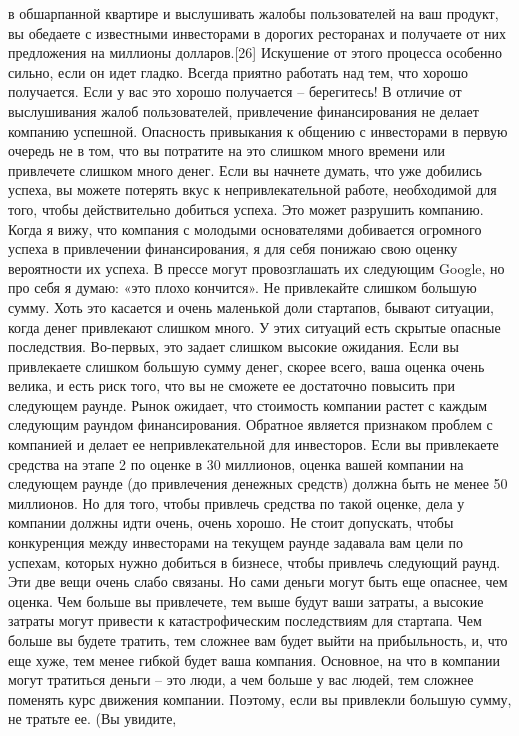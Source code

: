 \documentclass[ebook,12pt,oneside,openany]{memoir}
\begin{document}
в обшарпанной квартире и выслушивать жалобы пользователей на ваш
продукт, вы обедаете с известными инвесторами в дорогих ресторанах и
получаете от них предложения на миллионы долларов.[26] Искушение от
этого процесса особенно сильно, если он идет гладко. Всегда приятно
работать над тем, что хорошо получается. Если у вас это хорошо
получается – берегитесь! В отличие от выслушивания жалоб
пользователей, привлечение финансирования не делает компанию успешной.
Опасность привыкания к общению с инвесторами в первую очередь не в
том, что вы потратите на это слишком много времени или привлечете
слишком много денег. Если вы начнете думать, что уже добились успеха,
вы можете потерять вкус к непривлекательной работе, необходимой для
того, чтобы действительно добиться успеха. Это может разрушить
компанию. Когда я вижу, что компания с молодыми основателями
добивается огромного успеха в привлечении финансирования, я для себя
понижаю свою оценку вероятности их успеха. В прессе могут
провозглашать их следующим Google, но про себя я думаю: «это плохо
кончится». Не привлекайте слишком большую сумму. Хоть это касается и
очень маленькой доли стартапов, бывают ситуации, когда денег
привлекают слишком много. У этих ситуаций есть скрытые опасные
последствия. Во-первых, это задает слишком высокие ожидания. Если вы
привлекаете слишком большую сумму денег, скорее всего, ваша оценка
очень велика, и есть риск того, что вы не сможете ее достаточно
повысить при следующем раунде. Рынок ожидает, что стоимость компании
растет с каждым следующим раундом финансирования. Обратное является
признаком проблем с компанией и делает ее непривлекательной для
инвесторов. Если вы привлекаете средства на этапе 2 по оценке в 30
миллионов, оценка вашей компании на следующем раунде (до привлечения
денежных средств) должна быть не менее 50 миллионов. Но для того,
чтобы привлечь средства по такой оценке, дела у компании должны идти
очень, очень хорошо. Не стоит допускать, чтобы конкуренция между
инвесторами на текущем раунде задавала вам цели по успехам, которых
нужно добиться в бизнесе, чтобы привлечь следующий раунд. Эти две вещи
очень слабо связаны. Но сами деньги могут быть еще опаснее, чем
оценка. Чем больше вы привлечете, тем выше будут ваши затраты, а
высокие затраты могут привести к катастрофическим последствиям для
стартапа. Чем больше вы будете тратить, тем сложнее вам будет выйти на
прибыльность, и, что еще хуже, тем менее гибкой будет ваша компания.
Основное, на что в компании могут тратиться деньги – это люди, а чем
больше у вас людей, тем сложнее поменять курс движения компании.
Поэтому, если вы привлекли большую сумму, не тратьте ее. (Вы увидите,
\end{document}
